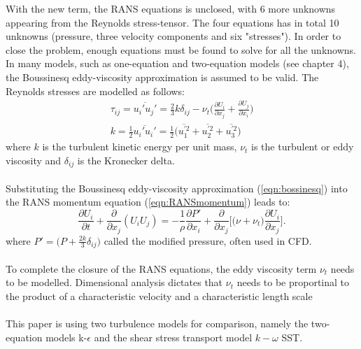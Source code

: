 \documentclass[a4paper, 12pt]{report}
\begin{document}
With the new term, the RANS equations is unclosed, with 6 more unknowns appearing from the Reynolds stress-tensor. The four equations has in total 10 unknowns (pressure, three velocity components and six "stresses"). In order to close the problem, enough equations must be found to solve for all the unknowns. In many models, such as one-equation and two-equation models (see \citep{Wilcox} chapter 4), the Boussinesq eddy-viscosity approximation \citep{CFD} is assumed to be valid. The Reynolds stresses are modelled as follows:
\begin{eqnarray}
\label{eqn:bossinesq}
\tau_{ij} = \overline{u_i'u_j'} = \frac{2}{3}k\delta_{ij} - \nu_t\big(\frac{\partial U_i}{\partial x_j} + \frac{\partial U_j}{\partial x_i}\big)\\
\label{eqn:TurbKineticEnergy}
k = \frac{1}{2}\overline{u_i' u_i'} = \frac{1}{2}\big(\overline{u_1^{'2}} + \overline{u_2^{'2}} + \overline{u_3^{'2}} \big)
\end{eqnarray}
where $k$ is the turbulent kinetic energy per unit mass, $\nu_t$ is the turbulent or eddy viscosity and $\delta_{ij}$ is the Kronecker  delta.\\
\\
Substituting the Boussinesq eddy-viscosity approximation (\ref{eqn:bossinesq}) into the RANS momentum equation (\ref{eqn:RANSmomentum}) leads to:
\begin{equation}
\frac{\partial U_i}{\partial t} +  \frac{\partial}{\partial x_j}(U_i U_j) = -\frac{1}{\rho} \frac{\partial P'}{\partial x_i} +  \frac{\partial}{\partial x_j}\Big[ \big(\nu + \nu_t\big) \frac{\partial U_i}{\partial x_j}\Big].
\end{equation}
where $P' = \big(P + \frac{2k}{3}\delta_{ij} \big)$ called the modified pressure\cite{Pope}, often used in CFD.\\
\\
To complete the closure of the RANS equations, the eddy viscosity term $\nu_t$ needs to be modelled. Dimensional analysis dictates that $\nu_t$ needs to be proportinal to the product of a characteristic velocity and a characteristic length scale \cite{Wilcox,AppliedMathematicalModelling}\\
\\
This paper is using two turbulence models for comparison, namely the two-equation models k-$\epsilon$ and the shear stress transport model $k-\omega$ SST.
\end{document}
